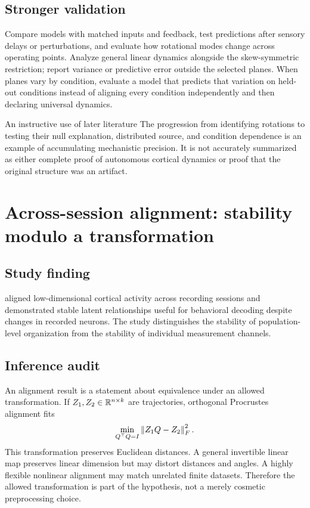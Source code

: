 \subsection{Stronger validation}
Compare models with matched inputs and feedback, test predictions after sensory delays or perturbations, and evaluate how rotational modes change across operating points. Analyze general linear dynamics alongside the skew-symmetric restriction; report variance or predictive error outside the selected planes. When planes vary by condition, evaluate a model that predicts that variation on held-out conditions instead of aligning every condition independently and then declaring universal dynamics.

\begin{insight}{An instructive use of later literature}
The progression from identifying rotations to testing their null explanation, distributed source, and condition dependence is an example of accumulating mechanistic precision. It is not accurately summarized as either complete proof of autonomous cortical dynamics or proof that the original structure was an artifact.
\end{insight}

\section{Across-session alignment: stability modulo a transformation}
\subsection{Study finding}
\citet{app_gallego2020} aligned low-dimensional cortical activity across recording sessions and demonstrated stable latent relationships useful for behavioral decoding despite changes in recorded neurons. The study distinguishes the stability of population-level organization from the stability of individual measurement channels.

\subsection{Inference audit}
An alignment result is a statement about equivalence under an allowed transformation. If \(Z_1,Z_2\in\mathbb{R}^{n\times k}\) are trajectories, orthogonal Procrustes alignment fits
\[
\min_{Q^\top Q=I}\left\lVert Z_1Q-Z_2\right\rVert_F^2.
\]
This transformation preserves Euclidean distances. A general invertible linear map preserves linear dimension but may distort distances and angles. A highly flexible nonlinear alignment may match unrelated finite datasets. Therefore the allowed transformation is part of the hypothesis, not a merely cosmetic preprocessing choice.

